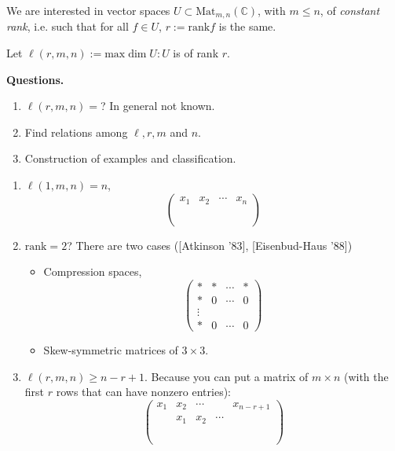 \medskip\noindent

We are interested in vector spaces $U \subset \text{Mat}_{m,n}(\mathbb{C})$,
with $m \leq n$, of {\it constant rank}, i.e. such that for all $f \in U$,
$r:=\text{rank}f$ is the same.

Let $\ell(r,m,n):=\text{max}\dim U:U$ is of rank $r$.

\medskip\noindent
{\bf Questions.}
\begin{enumerate}
\item $\ell(r,m,n)=$? In general not known.
\item Find relations among $\ell, r,m$ and $n$.
\item Construction of examples and classification.
\end{enumerate}

\begin{example}
\label{example-what-we-know}
\begin{enumerate}
\item $\ell(1,m,n)=n$,
$$
\begin{pmatrix}
x_1&x_2&\cdots &x_n\\
\\
\\
\\
\end{pmatrix}
$$
\item $\text{rank}=2$? There are two cases ([Atkinson '83], [Eisenbud-Haus '88])
\begin{itemize}
\item Compression spaces,
$$
\begin{pmatrix}
*&*&\cdots &*\\
*&0&\cdots & 0\\
\vdots &\\
*&0&\cdots&0
\end{pmatrix}
$$
\item Skew-symmetric matrices of $3 \times 3$.
\end{itemize}
\item $\ell(r,m,n) \geq n-r+1$. Because you can put a matrix of
$m\times n$ (with the first $r$ rows that can have nonzero entries):
$$
\begin{pmatrix}
x_1 &  x_2 &  \cdots & & x_{n-r+1}\\
& x_1 & x_2 & \cdots &\\
\\
\\
\\
\end{pmatrix}
$$
\end{enumerate}
\end{example}

